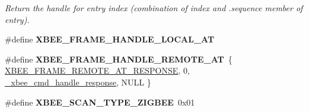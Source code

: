 \begin{DoxyCompactItemize}
\begin{DoxyCompactList}\small\item\em Return the handle for entry {\itshape index} (combination of {\itshape index} and {\itshape }.sequence member of entry). \end{DoxyCompactList}\item 
\#define {\bfseries X\+B\+E\+E\+\_\+\+F\+R\+A\+M\+E\+\_\+\+H\+A\+N\+D\+L\+E\+\_\+\+L\+O\+C\+A\+L\+\_\+\+AT}
\item 
\mbox{\label{group__xbee__atcmd_gab361800e13206736264e7d1e5ebd159a}} 
\#define {\bfseries X\+B\+E\+E\+\_\+\+F\+R\+A\+M\+E\+\_\+\+H\+A\+N\+D\+L\+E\+\_\+\+R\+E\+M\+O\+T\+E\+\_\+\+AT}~\{ \hyperlink{group__xbee__device_gga7753bbebaf00d6d64942f64b6ae9b7b9a3cd726459592fab4cdc9b5e6bbecb79f}{X\+B\+E\+E\+\_\+\+F\+R\+A\+M\+E\+\_\+\+R\+E\+M\+O\+T\+E\+\_\+\+A\+T\+\_\+\+R\+E\+S\+P\+O\+N\+SE}, 0, \hyperlink{group__xbee__atcmd_ga3b4559f4e729b1c96f5c0d9e4476aa7d}{\+\_\+xbee\+\_\+cmd\+\_\+handle\+\_\+response}, N\+U\+LL \}
\item 
\mbox{\label{group__xbee__atcmd_ga707fb13fddd604c1b306c6bd30d10a98}} 
\#define {\bfseries X\+B\+E\+E\+\_\+\+S\+C\+A\+N\+\_\+\+T\+Y\+P\+E\+\_\+\+Z\+I\+G\+B\+EE}~0x01
\end{DoxyCompactItemize}
